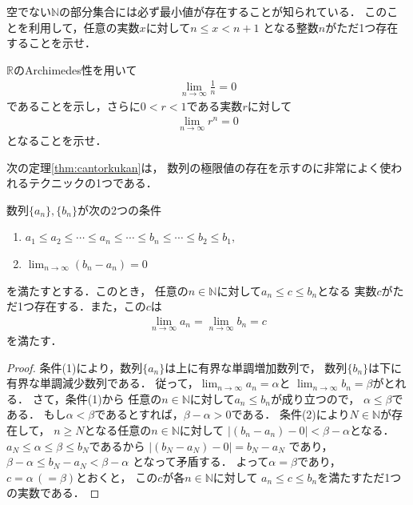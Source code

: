      \begin{que} \label{que:gausskigou}
       空でない$\mathbb{N}$の部分集合には必ず最小値が存在することが知られている．
       このことを利用して，任意の実数$x$に対して$n \leq x <n+1$
       となる整数$n$がただ1つ存在することを示せ．
     \end{que}

     \begin{que} \label{que:bekisyusoku}
       $\mathbb{R}$のArchimedes性を用いて
       \begin{align}
         \lim_{n \to \infty} \frac{1}{n} = 0
         \label{eq:n1syusoku}
       \end{align}
       であることを示し，さらに$0<r<1$である実数$r$に対して
       \begin{align}
         \lim_{n \to \infty} r ^n =0
         \label{eq:r1syusoku}
       \end{align}
       となることを示せ．
     \end{que}

     次の定理\ref{thm:cantorkukan}は，
     数列の極限値の存在を示すのに非常によく使われるテクニックの1つである．
     \begin{thm}[区間縮小法] \label{thm:cantorkukan}
       数列$\{ a_n \} ,  \{ b_n \}$が次の2つの条件
       \begin{enumerate}
         \item $a_1 \leq a_2 \leq \cdots \leq a_n \leq \cdots \leq b_n \leq \cdots \leq b_2 \leq b_1,$
         \item $\displaystyle \lim_{n \to \infty} (b_n - a_n ) =0$
       \end{enumerate}
       を満たすとする．このとき，
       任意の$n \in \mathbb{N}$に対して$a_n \leq c \leq b_n$となる
       実数$c$がただ1つ存在する．また，この$c$は
       \begin{align*}
         \lim_{n \to \infty} a_n = \lim_{n \to \infty} b_n =c
       \end{align*}
       を満たす．
     \end{thm}
     \begin{proof}
       条件(1)により，数列$\{ a_n \}$は上に有界な単調増加数列で，
       数列$\{ b_n \}$は下に有界な単調減少数列である．
       従って，$\displaystyle \lim_{n \to \infty} a_n = \alpha $と
       $\displaystyle \lim_{n \to \infty} b_n = \beta$がとれる．
       さて，条件(1)から
       任意の$n \in \mathbb{N}$に対して$a_n \leq b_n$が成り立つので，
       $\alpha \leq \beta$である．
       もし$\alpha < \beta$であるとすれば，$\beta - \alpha >0$である．
       条件(2)により$N \in \mathbb{N}$が存在して，
       $n \geq N$となる任意の$n \in \mathbb{N}$に対して
       $\lvert (b_n - a_n) - 0 \rvert < \beta - \alpha $となる．
       $a_N \leq \alpha \leq \beta \leq b_N$であるから
       $\lvert (b_N - a_N ) -0 \rvert = b_N-a_N$
       であり，$\beta - \alpha \leq b_N - a_N < \beta - \alpha $
       となって矛盾する．
       よって$\alpha = \beta$であり，$c= \alpha \, (= \beta )$とおくと，
       この$c$が各$n \in \mathbb{N}$に対して
       $a_n \leq c \leq b_n$を満たすただ1つの実数である．
     \end{proof}

